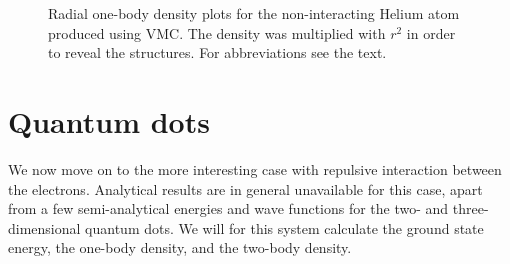 \begin{figure}[H]
	\centering
	\captionsetup[subfigure]{labelformat=empty}
	\caption{Radial one-body density plots for the non-interacting Helium atom produced using VMC. The density was multiplied with $r^2$ in order to reveal the structures. For abbreviations see the text.}
	\label{fig:helium_nointeraction}
\end{figure}

\cleardoublepage
\section{Quantum dots} \label{sec:quantumdotresults}
We now move on to the more interesting case with repulsive interaction between the electrons. Analytical results are in general unavailable for this case, apart from a few semi-analytical energies and wave functions for the two- and three-dimensional quantum dots. We will for this system calculate the ground state energy, the one-body density, and the two-body density. 


